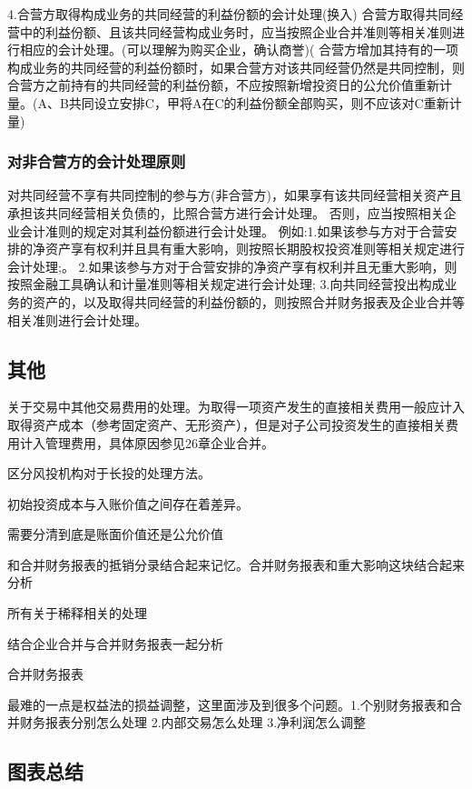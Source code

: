\documentclass[UTF8,12pt]{ctexart}
\numberwithin{equation}{section} %
\numberwithin{figure}{section}
\numberwithin{table}{section}
\begin{document}
	4.合营方取得构成业务的共同经营的利益份额的会计处理(换入)
	合营方取得共同经营中的利益份额、且该共同经营构成业务时，应当按照企业合并准则等相关准则进行相应的会计处理。(可以理解为购买企业，确认商誉)(
	合营方增加其持有的一项构成业务的共同经营的利益份额时，如果合营方对该共同经营仍然是共同控制，则合营方之前持有的共同经营的利益份额，不应按照新增投资日的公允价值重新计量。(A、B共同设立安排C，甲将A在C的利益份额全部购买，则不应该对C重新计量)
	
	\subsubsection{对非合营方的会计处理原则}
	对共同经营不享有共同控制的参与方(非合营方)，如果享有该共同经营相关资产且承担该共同经营相关负债的，比照合营方进行会计处理。
	否则，应当按照相关企业会计准则的规定对其利益份额进行会计处理。
	例如:1.如果该参与方对于合营安排的净资产享有权利并且具有重大影响，则按照长期股权投资准则等相关规定进行会计处理;。
	2.如果该参与方对于合营安排的净资产享有权利并且无重大影响，则按照金融工具确认和计量准则等相关规定进行会计处理;
	3.向共同经营投出构成业务的资产的，以及取得共同经营的利益份额的，则按照合并财务报表及企业合并等相关准则进行会计处理。
	
	\subsection{其他}
	关于交易中其他交易费用的处理。为取得一项资产发生的直接相关费用一般应计入取得资产成本（参考固定资产、无形资产），但是对子公司投资发生的直接相关费用计入管理费用，具体原因参见26章企业合并。
	
	区分风投机构对于长投的处理方法。
	
	初始投资成本与入账价值之间存在着差异。
	
	需要分清到底是账面价值还是公允价值
	
	和合并财务报表的抵销分录结合起来记忆。合并财务报表和重大影响这块结合起来分析
	
	所有关于稀释相关的处理
	
	结合企业合并与合并财务报表一起分析
	
	合并财务报表
	
	最难的一点是权益法的损益调整，这里面涉及到很多个问题。1.个别财务报表和合并财务报表分别怎么处理 2.内部交易怎么处理 3.净利润怎么调整
	
	
	\subsection{图表总结}
	
\end{document}
